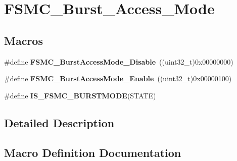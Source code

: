 \hypertarget{group___f_s_m_c___burst___access___mode}{}\section{F\+S\+M\+C\+\_\+\+Burst\+\_\+\+Access\+\_\+\+Mode}
\label{group___f_s_m_c___burst___access___mode}
\subsection*{Macros}
\begin{DoxyCompactItemize}
\item 
\hypertarget{group___f_s_m_c___burst___access___mode_ga26fc544945415e350563a9b00684850c}{}\#define {\bfseries F\+S\+M\+C\+\_\+\+Burst\+Access\+Mode\+\_\+\+Disable}~((uint32\+\_\+t)0x00000000)\label{group___f_s_m_c___burst___access___mode_ga26fc544945415e350563a9b00684850c}

\item 
\hypertarget{group___f_s_m_c___burst___access___mode_ga841831dfacfdd8889dafe26cc594bf02}{}\#define {\bfseries F\+S\+M\+C\+\_\+\+Burst\+Access\+Mode\+\_\+\+Enable}~((uint32\+\_\+t)0x00000100)\label{group___f_s_m_c___burst___access___mode_ga841831dfacfdd8889dafe26cc594bf02}

\item 
\#define {\bfseries I\+S\+\_\+\+F\+S\+M\+C\+\_\+\+B\+U\+R\+S\+T\+M\+O\+D\+E}(S\+T\+A\+T\+E)
\end{DoxyCompactItemize}


\subsection{Detailed Description}


\subsection{Macro Definition Documentation}
\hypertarget{group___f_s_m_c___burst___access___mode_gaf8736659c5064c3c03753d7874401e71}{}
